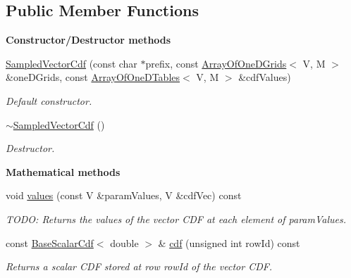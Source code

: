 \subsection*{Public Member Functions}
\begin{Indent}{\bf Constructor/\-Destructor methods}\par
\begin{DoxyCompactItemize}
\item 
\hyperlink{class_q_u_e_s_o_1_1_sampled_vector_cdf_a9ccd0e1af52f109a50cf9bc2f88370fb}{Sampled\-Vector\-Cdf} (const char $\ast$prefix, const \hyperlink{class_q_u_e_s_o_1_1_array_of_one_d_grids}{Array\-Of\-One\-D\-Grids}$<$ V, M $>$ \&one\-D\-Grids, const \hyperlink{class_q_u_e_s_o_1_1_array_of_one_d_tables}{Array\-Of\-One\-D\-Tables}$<$ V, M $>$ \&cdf\-Values)
\begin{DoxyCompactList}\small\item\em Default constructor. \end{DoxyCompactList}\item 
\hyperlink{class_q_u_e_s_o_1_1_sampled_vector_cdf_a5434d0c34434b0bdf073523aee4182be}{$\sim$\-Sampled\-Vector\-Cdf} ()
\begin{DoxyCompactList}\small\item\em Destructor. \end{DoxyCompactList}\end{DoxyCompactItemize}
\end{Indent}
\begin{Indent}{\bf Mathematical methods}\par
\begin{DoxyCompactItemize}
\item 
void \hyperlink{class_q_u_e_s_o_1_1_sampled_vector_cdf_a1d908923cf5b441a4cebf7ac3c7fd2d8}{values} (const V \&param\-Values, V \&cdf\-Vec) const 
\begin{DoxyCompactList}\small\item\em T\-O\-D\-O\-: Returns the values of the vector C\-D\-F at each element of {\ttfamily param\-Values}. \end{DoxyCompactList}\item 
const \hyperlink{class_q_u_e_s_o_1_1_base_scalar_cdf}{Base\-Scalar\-Cdf}$<$ double $>$ \& \hyperlink{class_q_u_e_s_o_1_1_sampled_vector_cdf_a51ee2c218b4e36dfc0c02bd542205789}{cdf} (unsigned int row\-Id) const 
\begin{DoxyCompactList}\small\item\em Returns a scalar C\-D\-F stored at row {\ttfamily row\-Id} of the vector C\-D\-F. \end{DoxyCompactList}\end{DoxyCompactItemize}
\end{Indent}
